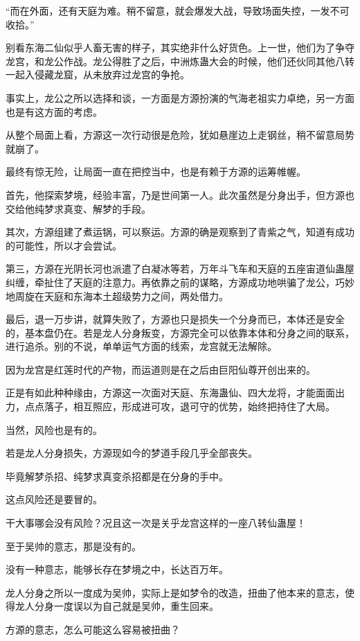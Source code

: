\begin{this_body}
“而在外面，还有天庭为难。稍不留意，就会爆发大战，导致场面失控，一发不可收拾。”

别看东海二仙似乎人畜无害的样子，其实绝非什么好货色。上一世，他们为了争夺龙宫，和龙公作战。龙公得胜了之后，中洲炼蛊大会的时候，他们还伙同其他八转一起入侵藏龙窟，从未放弃过龙宫的争抢。

事实上，龙公之所以选择和谈，一方面是方源扮演的气海老祖实力卓绝，另一方面也是有这方面的考虑。

从整个局面上看，方源这一次行动很是危险，犹如悬崖边上走钢丝，稍不留意局势就崩了。

最终有惊无险，让局面一直在把控当中，也是有赖于方源的运筹帷幄。

首先，他探索梦境，经验丰富，乃是世间第一人。此次虽然是分身出手，但方源也交给他纯梦求真变、解梦的手段。

其次，方源组建了煮运锅，可以察运。方源的确是观察到了青紫之气，知道有成功的可能性，所以才会尝试。

第三，方源在光阴长河也派遣了白凝冰等若，万年斗飞车和天庭的五座宙道仙蛊屋纠缠，牵扯住了天庭的注意力。再依靠之前的谋略，方源成功地哄骗了龙公，巧妙地周旋在天庭和东海本土超级势力之间，两处借力。

最后，退一万步讲，就算失败了，方源也只是损失一个分身而已，本体还是安全的，基本盘仍在。若是龙人分身叛变，方源完全可以依靠本体和分身之间的联系，进行追杀。别的不说，单单运气方面的线索，龙宫就无法解除。

因为龙宫是红莲时代的产物，而运道则是在之后由巨阳仙尊开创出来的。

正是有如此种种缘由，方源这一次面对天庭、东海蛊仙、四大龙将，才能面面出力，点点落子，相互照应，形成进可攻，退可守的优势，始终把持住了大局。

当然，风险也是有的。

若是龙人分身损失，方源现如今的梦道手段几乎全部丧失。

毕竟解梦杀招、纯梦求真变杀招都是在分身的手中。

这点风险还是要冒的。

干大事哪会没有风险？况且这一次是关乎龙宫这样的一座八转仙蛊屋！

至于吴帅的意志，那是没有的。

没有一种意志，能够长存在梦境之中，长达百万年。

龙人分身之所以一度成为吴帅，实际上是如梦令的改造，扭曲了他本来的意志，使得龙人分身一度误以为自己就是吴帅，重生回来。

方源的意志，怎么可能这么容易被扭曲？


\end{this_body}
